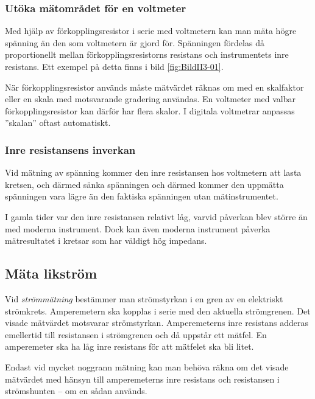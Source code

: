 \subsubsection{Utöka mätområdet för en voltmeter}

Med hjälp av förkopplingsresistor i serie med voltmetern kan man mäta
högre spänning än den som voltmetern är gjord för.
Spänningen fördelas då proportionellt mellan förkopplingsresistorns resistans
och instrumentets inre resistans.
Ett exempel på detta finns i bild \ref{fig:BildII3-01}.

När förkopplingsresistor används måste mätvärdet räknas om med en
skalfaktor eller en skala med motsvarande gradering användas.
En voltmeter med valbar förkopplingsresistor kan därför har flera skalor.
I digitala voltmetrar anpassas ''skalan'' oftast automatiskt.

\newpage %
\subsubsection{Inre resistansens inverkan}

Vid mätning av spänning kommer den inre resistansen hos voltmetern att lasta
kretsen, och därmed sänka spänningen och därmed kommer den uppmätta spänningen
vara lägre än den faktiska spänningen utan mätinstrumentet.

I gamla tider var den inre resistansen relativt låg, varvid påverkan blev större
än med moderna instrument.
Dock kan även moderna instrument påverka mätresultatet i kretsar som har väldigt
hög impedans.

\subsection{Mäta likström}

Vid \emph{strömmätning} bestämmer man strömstyrkan i en gren av en elektriskt
strömkrets.
Amperemetern ska kopplas i serie med den aktuella strömgrenen.
Det visade mätvärdet motsvarar strömstyrkan.
Amperemeterns inre resistans adderas emellertid till resistansen i strömgrenen
och då uppstår ett mätfel.
En amperemeter ska ha låg inre resistans för att mätfelet ska bli litet.

Endast vid mycket noggrann mätning kan man behöva räkna om det visade
mätvärdet med hänsyn till amperemeterns inre resistans och resistansen
i strömshunten -- om en sådan används.

